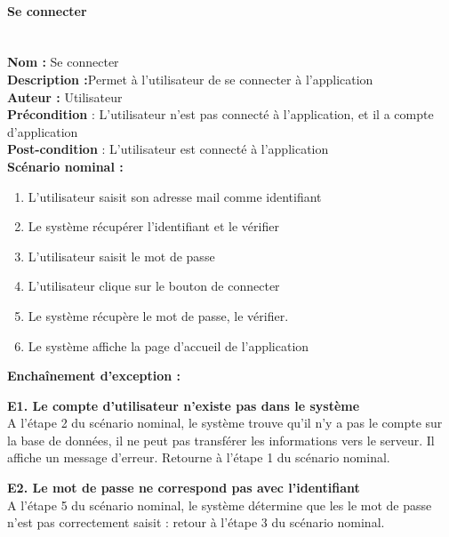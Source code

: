\documentclass[12pt]{article}
\begin{document}
\paragraph{Se connecter}
\leavevmode \\
\textbf{Nom :} Se connecter \\
\textbf{Description :}Permet à l’utilisateur de se connecter à l’application\\
\textbf{Auteur : } Utilisateur\\
\textbf{Précondition} : L’utilisateur n’est pas connecté à l’application, et il a compte d'application\\
\textbf{Post-condition} : L’utilisateur est connecté à l’application\\
\textbf{Scénario nominal :}
\begin{enumerate}
    \item L'utilisateur saisit son adresse mail comme identifiant
	\item Le système récupérer l'identifiant et le vérifier
	\item L'utilisateur saisit le mot de passe
	\item L'utilisateur clique sur le bouton de connecter
	\item Le système récupère le mot de passe, le vérifier.
	\item Le système affiche la page d'accueil de l'application
\end{enumerate}

\textbf{Enchaînement d’exception :}
\begin{description}
	\item \textbf{E1. Le compte d'utilisateur n'existe pas dans le système}\\
	A l’étape 2 du scénario nominal, le système trouve qu'il n'y a pas le compte sur la base de données, il ne peut pas transférer les informations vers le serveur. Il affiche un message d’erreur. Retourne à l’étape 1 du scénario nominal.
	\item \textbf{E2. Le mot de passe ne correspond pas avec l'identifiant}\\
	A l’étape 5 du scénario nominal, le système détermine que les le mot de passe n’est pas correctement saisit : retour à l’étape 3 du scénario nominal.\\
\end{description}


\end{document}
